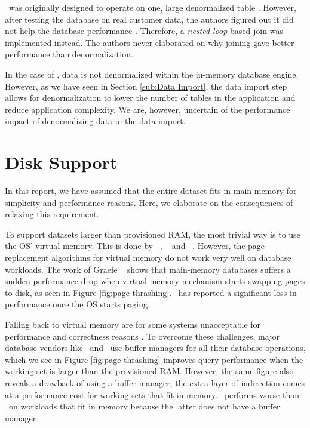 \blink~was originally designed to operate on one, large denormalized table \cite{Johnson2008-cp}. However, after testing the database on real customer data, the authors figured out it did not help the database performance \cite{Barber2012-xt}. Therefore, a \textit{nested loop} based join was implemented instead. The authors never elaborated on why joining gave better performance than denormalization.

In the case of \qlikview, data is not denormalized within the in-memory database engine. However, as we have seen in Section \ref{sub:Data Import}, the data import step allows for denormalization to lower the number of tables in the application and reduce application complexity. We are, however, uncertain of the performance impact of denormalizing data in the data import. 

\section{Disk Support}
\label{sec:Disk Support}


In this report, we have assumed that the entire dataset fits in main memory for simplicity and performance reasons. Here, we elaborate on the consequences of relaxing this requirement. 

To support datasets larger than provisioned RAM, the most trivial way is to use the OS' virtual memory. This is done by \monetdb~\cite{Boncz2002-yj}, \blink~\cite{Barber2014-ey} and \qlikview~\cite{Qlik2011-ef}. However, the page replacement algorithms for virtual memory do not work very well on database workloads. The work of Graefe \ea~\cite{Graefe2014-ds} shows that main-memory databases suffers a sudden performance drop when virtual memory mechanism starts swapping pages to disk, as seen in Figure \ref{fig:page-thrashing}. \qlikview~has reported a significant loss in performance once the OS starts paging. 

Falling back to virtual memory are for some systems unacceptable for performance and correctness reasons \cite{Graefe2014-ds}. To overcome these challenges, major database vendors like \oracle~and \mssql~use buffer managers for all their database operations, which we see in Figure \ref{fig:page-thrashing} improves query performance when the working set is larger than the provisioned RAM. However, the same figure also reveals a drawback of using a buffer manager; the extra layer of indirection comes at a performance cost for working sets that fit in memory. \mssql~performs worse than \vertipaq~on workloads that fit in memory because the latter does not have a buffer manager \cite{Ferrari2012-hm}

